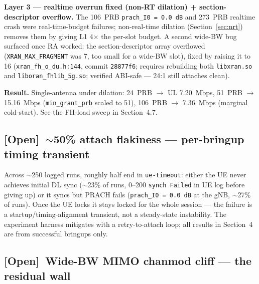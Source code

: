 \documentclass[11pt,a4paper]{article}
\newcommand{\openissue}{\textcolor{opencol}{\textbf{[Open]}}}
\begin{document}
\textbf{Layer 3 --- realtime overrun fixed (non-RT dilation) + section-descriptor overflow.}
The 106~PRB \texttt{prach\_I0 = 0.0~dB} and 273~PRB realtime crash were real-time-budget
failures; non-real-time dilation (Section~\ref{sec:nrt}) removes them by giving L1 4$\times$ the
per-slot budget. A second wide-BW bug surfaced once RA worked: the section-descriptor array
overflowed (\texttt{XRAN\_MAX\_FRAGMENT} was 7, too small for a wide-BW slot), fixed by raising
it to 16 (\texttt{xran\_fh\_o\_du.h:144}, commit \texttt{28877f6}; requires rebuilding both
\texttt{libxran.so} and \texttt{liboran\_fhlib\_5g.so}; verified ABI-safe --- 24:1 still
attaches clean).

\textbf{Result.} Single-antenna under dilation: 24~PRB $\rightarrow$ UL 7.20~Mbps,
51~PRB $\rightarrow$ 15.16~Mbps (\texttt{min\_grant\_prb} scaled to 51), 106~PRB
$\rightarrow$ 7.36~Mbps (marginal cold-start). See the FH-load sweep in Section~4.7.

\subsection{\texorpdfstring{\openissue}{[Open]}\ $\sim$50\% attach flakiness --- per-bringup timing transient}

Across $\sim$250 logged runs, roughly half end in \texttt{ue-timeout}: either the UE never
achieves initial DL sync ($\sim$23\% of runs, 0--200 \texttt{synch Failed} in UE log before
giving up) or it syncs but PRACH fails (\texttt{prach\_I0 = 0.0~dB} at the gNB, $\sim$27\%
of runs). Once the UE locks it stays locked for the whole session --- the failure is a
startup/timing-alignment transient, not a steady-state instability. The experiment harness
mitigates with a retry-to-attach loop; all results in Section~4 are from successful
bringups only.

\subsection{\texorpdfstring{\openissue}{[Open]}\ Wide-BW MIMO chanmod cliff --- the residual wall}
\label{sec:chanmod}
\end{document}
